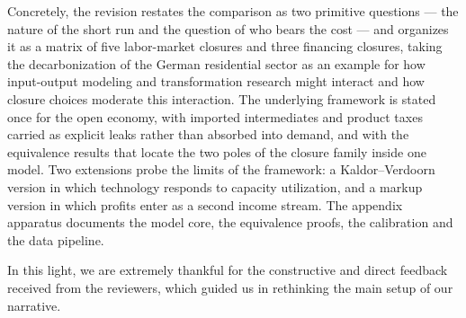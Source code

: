 Concretely, the revision restates the comparison as two primitive questions --- the
nature of the short run and the question of who bears the cost --- and organizes it
as a matrix of five labor-market closures and three financing closures, taking the
decarbonization of the German residential sector as an example for how input-output
modeling and transformation research might interact and how closure choices moderate
this interaction. The underlying framework is stated once for the open economy, with
imported intermediates and product taxes carried as explicit leaks rather than
absorbed into demand, and with the equivalence results that locate the two poles of
the closure family inside one model. Two extensions probe the limits of the
framework: a Kaldor--Verdoorn version in which technology responds to capacity utilization, and a
markup version in which profits enter as a second income stream. The appendix apparatus documents the model core, the equivalence proofs, the calibration and the data
pipeline.

In this light, we are extremely thankful for the constructive and direct
feedback received from the reviewers, which guided us in rethinking the main
setup of our narrative.

